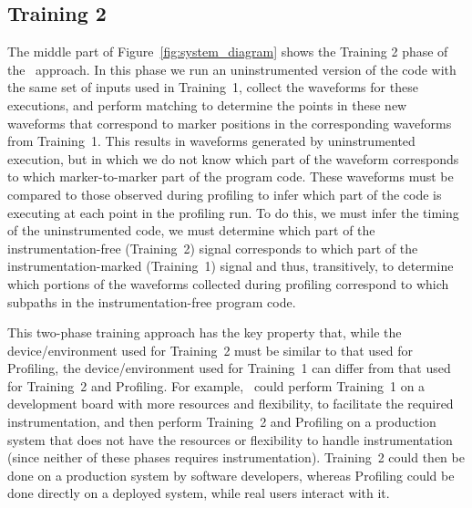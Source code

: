 \subsection{Training 2}
\label{sec:train2}

The middle part of Figure~\ref{fig:system_diagram} shows the Training 2 phase of the \zop\ approach.  In this phase we run an uninstrumented version of the code with the same set of inputs used in Training~1, collect the waveforms for these executions, and perform matching to determine the points in these new waveforms that correspond to marker positions in the corresponding waveforms from Training~1. This results in waveforms generated by uninstrumented execution, but in which we do not know which part of the waveform corresponds to which marker-to-marker part of the program code. These waveforms must be compared to those observed during profiling to infer which part of the code is executing at each point in the profiling run. To do this, we must infer the timing of the uninstrumented code, \ie we must determine which part of the instrumentation-free (Training~2) signal corresponds to which part of the instrumentation-marked (Training~1) signal and thus, transitively, to determine which portions of the waveforms collected during profiling correspond to which subpaths in the instrumentation-free program code.

This two-phase training approach has the key property that, while the device/environment used for Training~2 must be similar to that used for Profiling, the device/environment used for Training~1 can differ from that used for Training~2 and Profiling. For example, \zop\ could perform Training~1 on a development board with more resources and flexibility, to facilitate the required instrumentation, and then perform Training~2 and Profiling on a production system that does not have the resources or flexibility to handle instrumentation (since neither of these phases requires instrumentation). Training~2 could then be done on a production system by software developers, whereas Profiling could be done directly on a deployed system, while real users interact with it. 

